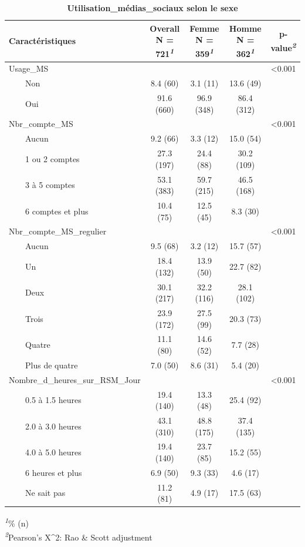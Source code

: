 \documentclass[
]{article}
\begin{document}
\newpage
\begin{table}[!t]
\caption{\label{tab:unnamed-chunk-9}\textbf{Utilisation\_médias\_sociaux selon le sexe}} 
\fontsize{12.0pt}{14.4pt}\selectfont
\begin{tabular*}{\linewidth}{@{\extracolsep{\fill}}lcccc}
\toprule
\textbf{Caractéristiques} & \textbf{Overall}  N = 721\textsuperscript{\textit{1}} & \textbf{Femme}  N = 359\textsuperscript{\textit{1}} & \textbf{Homme}  N = 362\textsuperscript{\textit{1}} & \textbf{p-value}\textsuperscript{\textit{2}} \\ 
\midrule\addlinespace[2.5pt]
Usage\_MS &  &  &  & <0.001 \\ 
    Non & 8.4 (60) & 3.1 (11) & 13.6 (49) &  \\ 
    Oui & 91.6 (660) & 96.9 (348) & 86.4 (312) &  \\ 
Nbr\_compte\_MS &  &  &  & <0.001 \\ 
    Aucun & 9.2 (66) & 3.3 (12) & 15.0 (54) &  \\ 
    1 ou 2 comptes & 27.3 (197) & 24.4 (88) & 30.2 (109) &  \\ 
    3 à 5 comptes & 53.1 (383) & 59.7 (215) & 46.5 (168) &  \\ 
    6 comptes et plus & 10.4 (75) & 12.5 (45) & 8.3 (30) &  \\ 
Nbr\_compte\_MS\_regulier &  &  &  & <0.001 \\ 
    Aucun & 9.5 (68) & 3.2 (12) & 15.7 (57) &  \\ 
    Un & 18.4 (132) & 13.9 (50) & 22.7 (82) &  \\ 
    Deux & 30.1 (217) & 32.2 (116) & 28.1 (102) &  \\ 
    Trois & 23.9 (172) & 27.5 (99) & 20.3 (73) &  \\ 
    Quatre & 11.1 (80) & 14.6 (52) & 7.7 (28) &  \\ 
    Plus de quatre & 7.0 (50) & 8.6 (31) & 5.4 (20) &  \\ 
Nombre\_d\_heures\_sur\_RSM\_Jour &  &  &  & <0.001 \\ 
    0.5 à 1.5 heures & 19.4 (140) & 13.3 (48) & 25.4 (92) &  \\ 
    2.0 à 3.0 heures & 43.1 (310) & 48.8 (175) & 37.4 (135) &  \\ 
    4.0 à 5.0 heures & 19.4 (140) & 23.7 (85) & 15.2 (55) &  \\ 
    6 heures et plus & 6.9 (50) & 9.3 (33) & 4.6 (17) &  \\ 
    Ne sait pas & 11.2 (81) & 4.9 (17) & 17.5 (63) &  \\ 
\bottomrule
\end{tabular*}
\begin{minipage}{\linewidth}
\textsuperscript{\textit{1}}\% (n)\\
\textsuperscript{\textit{2}}Pearson's X\^{}2: Rao \& Scott adjustment\\
\end{minipage}
\end{table}
\vspace{2cm}
\end{document}
